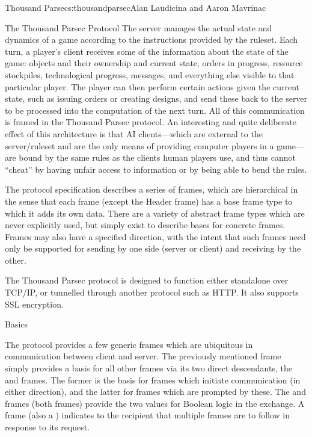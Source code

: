 \begin{aosachapter}{Thousand Parsec}{s:thousandparsec}{Alan Laudicina and Aaron Mavrinac}
\begin{aosasect1}{The Thousand Parsec Protocol}
The server manages the actual state and dynamics of a game according
to the instructions provided by the ruleset. Each turn, a player's
client receives some of the information about the state of the game:
objects and their ownership and current state, orders in progress,
resource stockpiles, technological progress, messages, and everything
else visible to that particular player. The player can then perform
certain actions given the current state, such as issuing orders or
creating designs, and send these back to the server to be processed
into the computation of the next turn. All of this communication is
framed in the Thousand Parsec protocol. An interesting and quite
deliberate effect of this architecture is that AI clients---which are
external to the server/ruleset and are the only means of providing
computer players in a game---are bound by the same rules as the
clients human players use, and thus cannot ``cheat'' by having unfair
access to information or by being able to bend the rules.

The protocol specification describes a series of frames, which are
hierarchical in the sense that each frame (except the Header frame)
has a base frame type to which it adds its own data. There are a
variety of abstract frame types which are never explicitly used, but
simply exist to describe bases for concrete frames. Frames may also
have a specified direction, with the intent that such frames need only
be supported for sending by one side (server or client) and receiving
by the other.

The Thousand Parsec protocol is designed to function either standalone
over TCP/IP, or tunnelled through another protocol such as HTTP.  It
also supports SSL encryption.

\begin{aosasect2}{Basics}

The protocol provides a few generic frames which are ubiquitous in
communication between client and server. The previously mentioned
 frame simply provides a basis for all other frames via
its two direct descendants, the  and 
frames. The former is the basis for frames which initiate
communication (in either direction), and the latter for frames which
are prompted by these. The  and  frames (both
 frames) provide the two values for Boolean logic in
the exchange. A  frame (also a )
indicates to the recipient that multiple frames are to follow in
response to its request.


\end{aosasect2}
\end{aosasect1}
\end{aosachapter}
